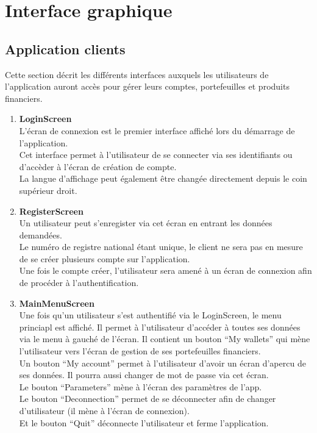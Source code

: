\documentclass{article}
\begin{document}
\section{Interface graphique}

\subsection{Application clients}
Cette section décrit les différents interfaces auxquels les utilisateurs de l'application auront accès pour gérer leurs comptes, portefeuilles et produits financiers.\\

\begin{enumerate}
\item \textbf{LoginScreen} \\ 
L'écran de connexion est le premier interface affiché lors du démarrage de l'application.\\
Cet interface permet à l'utilisateur de se connecter via ses identifiants ou d'accèder à l'écran de création de compte.\\
La langue d'affichage peut également être changée directement depuis le coin supérieur droit.

\item \textbf{RegisterScreen} \\
Un utilisateur peut s'enregister via cet écran en entrant les données demandées.\\
Le numéro de registre national étant unique, le client ne sera pas en mesure de se créer plusieurs compte sur l'application.\\
Une fois le compte créer, l'utilisateur sera amené à un écran de connexion afin de procéder à l'authentification.

\item \textbf{MainMenuScreen} \\
Une fois qu'un utilisateur s'est authentifié via le LoginScreen, le menu princiapl est affiché. Il permet à l'utilisateur d'accéder à toutes ses données via le menu à gauché de l'écran. Il contient un bouton ``My wallets'' qui mène l'utilisateur vers l'écran de gestion de ses portefeuilles financiers.\\
Un bouton ``My account'' permet à l'utilisateur d'avoir un écran d'apercu de ses données. Il pourra aussi changer de mot de passe via cet écran.\\
Le bouton ``Parameters'' mène à l'écran des paramètres de l'app.\\
Le bouton ``Deconnection'' permet de se déconnecter afin de changer d'utilisateur (il mène à l'écran de connexion).\\
Et le bouton ``Quit'' déconnecte l'utilisateur et ferme l'application.


\end{enumerate}
\end{document}
